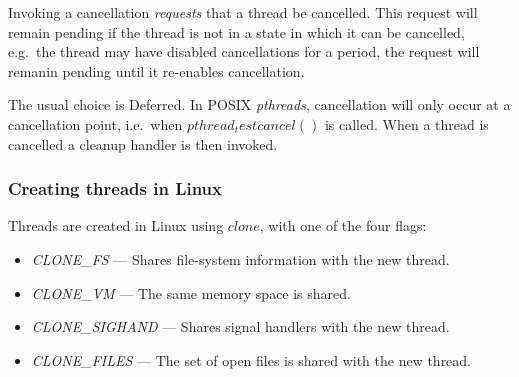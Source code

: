 Invoking a cancellation \textit{requests} that a thread be cancelled. This request will
remain pending if the thread is not in a state in which it can be cancelled, e.g.\ the thread
may have disabled cancellations for a period, the request will remanin pending until it re-enables
cancellation.

The usual choice is Deferred. In POSIX \textit{pthreads}, cancellation will only occur
at a cancellation point, i.e.\ when $pthread_testcancel()$ is called. When a thread is cancelled
a cleanup handler is then invoked.


\subsubsection{Creating threads in Linux}

Threads are created in Linux using $clone$, with one of the four flags:
\begin{itemize}
    \item \textit{CLONE\_FS} --- Shares file-system information with the new thread.
    \item \textit{CLONE\_VM} --- The same memory space is shared.
    \item \textit{CLONE\_SIGHAND} --- Shares signal handlers with the new thread.
    \item \textit{CLONE\_FILES} --- The set of open files is shared with the new thread.
\end{itemize}